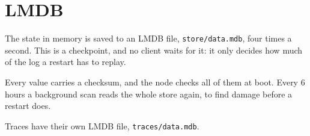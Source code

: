 
\section{LMDB}

The state in memory is saved to an LMDB file, \texttt{store/data.mdb}, four times a second. This is
a checkpoint, and no client waits for it: it only decides how much of the log a restart has to
replay.

Every value carries a checksum, and the node checks all of them at boot. Every 6 hours a
background scan reads the whole store again, to find damage before a restart does.

Traces have their own LMDB file, \texttt{traces/data.mdb}.

